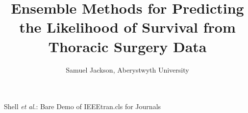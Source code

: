\documentclass[journal]{IEEEtran}
\begin{document}
%
\title{Ensemble Methods for Predicting the Likelihood of Survival from Thoracic Surgery Data}
%
%
%

\author{Samuel Jackson, Aberystwyth University}

% 
%



\markboth{\today}%
{Shell \MakeLowercase{\textit{et al.}}: Bare Demo of IEEEtran.cls for Journals}
% 




\end{document}
